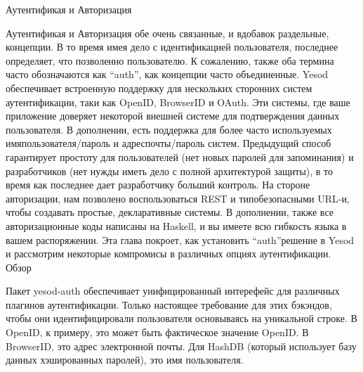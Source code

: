 Аутентификая и Авторизация

Аутентификая и Авторизация обе очень связанные, и вдобавок раздельные, концепции. В то время имея дело с идентификацией пользователя, последнее определяет, что позволенно пользователю. К сожалению, также оба термина часто обозначаются как \textquotedblleft auth\textquotedblright, как концепции часто объединенные.
Yesod обеспечивает встроенную поддержку для нескольких сторонних систем аутентификации, таки как OpenID, BrowserID и OAuth. Эти системы, где ваше приложение доверяет некоторой внешней системе для подтверждения данных пользователя. В дополнении, есть поддержка для более часто используемых имяпользователя/пароль и адреспочты/пароль систем. Предыдущий способ гарантирует простоту для пользователей (нет новых паролей для запоминания) и разработчиков (нет нужды иметь дело с полной архитектурой защиты), в то время как последнее дает разработчику больший контроль.
На стороне авторизации, нам позволено воспользоваться REST и типобезопасными URL-и, чтобы создавать простые, декларативные системы. В дополнении, также все авторизационные коды написаны на Haskell, и вы имеете всю гибкость языка в вашем распоряжении.
Эта глава покроет, как установить \textquotedblleft auth\textquotedblright решение в Yesod и рассмотрим некоторые компромисы в различных опциях аутентификации.
Обзор

Пакет yesod-auth обеспечивает унифицированный интерефейс для различных плагинов аутентификации. Только настоящее требование для этих бэкэндов, чтобы они идентифицировали пользователя основываясь на уникальной строке. В OpenID, к примеру, это может быть фактическое значение OpenID. В BrowserID, это адрес электронной почты. Для HashDB (который использует базу данных хэшированных паролей), это имя пользователя.